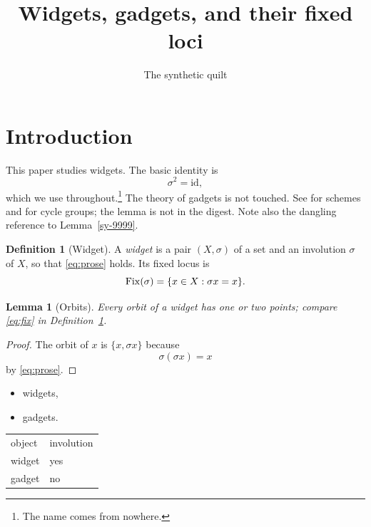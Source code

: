 \documentclass{amsart}
\title{Widgets, gadgets, and their fixed loci}
\author{The synthetic quilt}
\theoremstyle{plain}
\newtheorem{lemma}[theorem]{Lemma}
\theoremstyle{definition}
\newtheorem{definition}[theorem]{Definition}
\theoremstyle{remark}
\begin{document}
\maketitle

\section{Introduction}\label{sy-0100}

This paper studies widgets. The basic identity is
\begin{equation}\label{eq:prose}
\sigma^2 = \mathrm{id},
\end{equation}
which we use throughout.\footnote{The name comes from nowhere.} The \GW{} theory of gadgets is not touched. See \cite[Chapter II]{Har77} for schemes and \cite[Theorem 2.1]{Kre99} for cycle groups; the lemma \cite[Lemma 9]{Kre99} is not in the digest. Note also the dangling reference to Lemma~\ref{sy-9999}.

\begin{definition}[Widget]\label{sy-0001}
A \emph{widget} is a pair $(X,\sigma)$ of a set and an involution $\sigma$ of $X$, so that \eqref{eq:prose} holds. Its fixed locus is
\begin{equation}\label{eq:fix}
\operatorname{Fix}(\sigma) = \{x \in X : \sigma x = x\}.
\end{equation}
\end{definition}


\begin{lemma}[Orbits]\label{sy-0002}
Every orbit of a widget has one or two points; compare \eqref{eq:fix} in Definition~\ref{sy-0001}.
\end{lemma}
\begin{proof}
The orbit of $x$ is $\{x, \sigma x\}$ because
\begin{equation}\label{eq:step}
\sigma(\sigma x) = x
\end{equation}
by \eqref{eq:prose}.
\end{proof}


\begin{itemize}
\item widgets,
\item gadgets.
\end{itemize}

\begin{tabular}{ll}
object & involution \\
widget & yes \\
gadget & no
\end{tabular}
\end{document}
